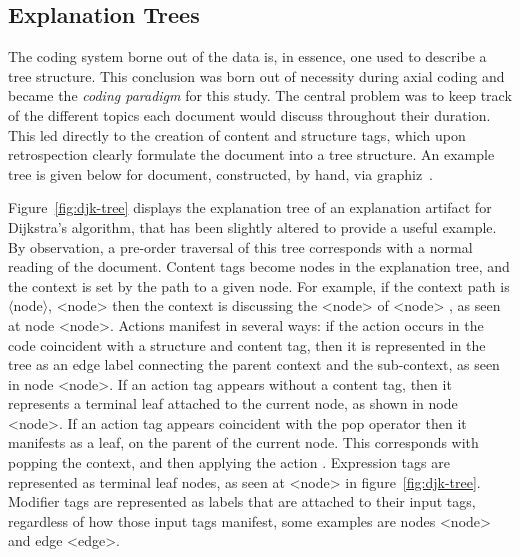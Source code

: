 \documentclass[sigconf]{acmart}
\newcommand{\brackets}[1]{$\langle$\ignorespaces#1\unskip$\rangle$}
\begin{document}
\subsection{Explanation Trees}
\label{sec:res:xopTree}
The coding system borne out of the data is, in essence, one used to describe a
tree structure. This conclusion was born out of necessity during axial coding
and became the \emph{coding paradigm} for this study. The central problem was to
keep track of the different topics each document would discuss throughout their
duration. This led directly to the creation of content and structure tags, which
upon retrospection clearly formulate the document into a tree structure. An
example tree is given below for document, constructed, by hand, via
graphiz~\cite{Ellson2002}.



Figure~\ref{fig:djk-tree} displays the explanation tree of an explanation
artifact for Dijkstra's algorithm, that has been slightly altered to provide a
useful example. By observation, a pre-order traversal of this
tree corresponds with a normal reading of the document. Content tags become
nodes in the explanation tree, and the context is set by the path to a given
node. For example, if the context path is \brackets{node}, <node> then the context is
discussing the <node> of <node> , as seen at node <node>. Actions manifest in several ways: if the
action occurs in the code coincident with a structure and content tag, then it
is represented in the tree as an edge label connecting the parent context and
the sub-context, as seen in node <node>. If an action tag appears without a
content tag, then it represents a terminal leaf attached to the current node, as
shown in node <node>. If an action tag appears coincident with the pop operator
then it manifests as a leaf, on the parent of the current node. This corresponds
with popping the context, and then applying the action . Expression tags are
represented as terminal leaf nodes, as seen at <node> in figure~\ref{fig:djk-tree}.
Modifier tags are represented as labels that are attached to their input tags,
regardless of how those input tags manifest, some examples are nodes <node> and
edge <edge>.
\end{document}
